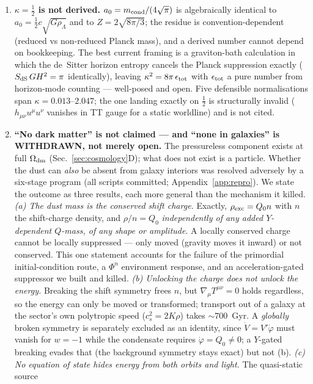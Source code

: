 \documentclass[aps,prd,twocolumn,10pt,nofootinbib,superscriptaddress]{revtex4-2}
\begin{document}
\begin{enumerate}
\item \textbf{$\kappa=\tfrac12$ is not derived.} $a_0=m_{\rm cond}/(4\sqrt\pi)$ is algebraically
identical to $a_0=\tfrac12 c\sqrt{G\rho_\Lambda}$ and to $Z=2\sqrt{8\pi/3}$; the residue is
convention-dependent (reduced vs non-reduced Planck mass), and a derived number cannot depend on
bookkeeping. The best current framing is a graviton-bath calculation in which the de~Sitter horizon
entropy cancels the Planck suppression exactly ($S_{\rm dS}\,GH^2=\pi$ identically), leaving
$\kappa^2=8\pi\,\epsilon_{\rm tot}$ with $\epsilon_{\rm tot}$ a pure number from horizon-mode
counting --- well-posed and open. Five defensible normalisations span $\kappa=0.013$--$2.047$; the
one landing exactly on $\tfrac12$ is structurally invalid ($h_{\mu\nu}u^\mu u^\nu$ vanishes in TT
gauge for a static worldline) and is not cited.
\item \textbf{``No dark matter'' is not claimed --- and ``none in galaxies'' is WITHDRAWN, not
merely open.} The pressureless component exists at full $\Omega_{\rm dm}$ (Sec.~\ref{sec:cosmology}D);
what does not exist is a particle. Whether the dust can \emph{also} be absent from galaxy interiors
was resolved adversely by a six-stage program (all scripts committed; Appendix~\ref{app:repro}). We
state the outcome as three results, each more general than the mechanism it killed.
\emph{(a) The dust mass is the conserved shift charge.} Exactly, $\rho_{\rm exc}=Q_0 n$ with $n$ the
shift-charge density, and $\rho/n=Q_0$ \emph{independently of any added $Y$-dependent $Q$-mass, of
any shape or amplitude}. A locally conserved charge cannot be locally suppressed --- only moved
(gravity moves it inward) or not conserved. This one statement accounts for the failure of the
primordial initial-condition route, a $\Phi^n$ environment response, and an acceleration-gated
suppressor we built and killed.
\emph{(b) Unlocking the charge does not unlock the energy.} Breaking the shift symmetry frees $n$,
but $\nabla_\mu T^{\mu\nu}=0$ holds regardless, so the energy can only be moved or transformed;
transport out of a galaxy at the sector's own polytropic speed ($c_s^2=2K\rho$) takes
$\sim\!700$~Gyr. A \emph{globally} broken symmetry is separately excluded as an identity, since
$\dot V=V'\dot\varphi$ must vanish for $w=-1$ while the condensate requires $\dot\varphi=Q_0\neq0$;
a $Y$-gated breaking evades that (the background symmetry stays exact) but not (b).
\emph{(c) No equation of state hides energy from both orbits and light.} The quasi-static source

\end{enumerate}
\end{document}
